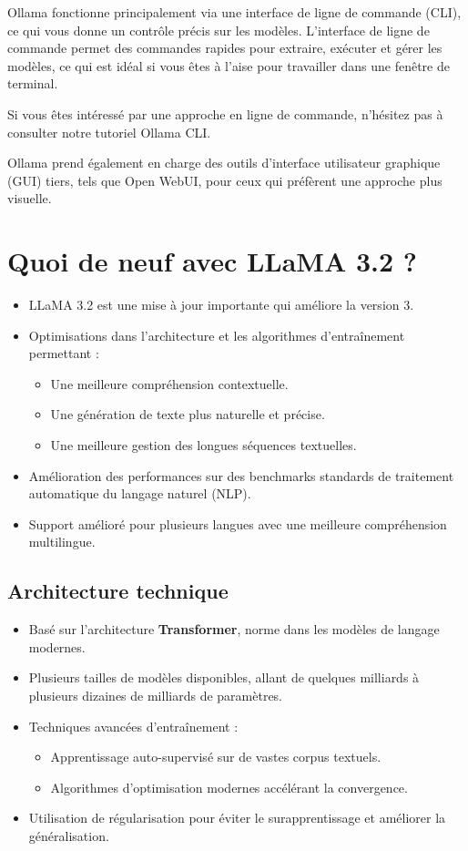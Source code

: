 Ollama fonctionne principalement via une interface de ligne de commande (CLI), ce qui vous donne un contrôle précis sur les modèles. L’interface de ligne de commande permet des commandes rapides pour extraire, exécuter et gérer les modèles, ce qui est idéal si vous êtes à l’aise pour travailler dans une fenêtre de terminal.

\medskip

Si vous êtes intéressé par une approche en ligne de commande, n’hésitez pas à consulter notre tutoriel Ollama CLI.

\medskip

Ollama prend également en charge des outils d’interface utilisateur graphique (GUI) tiers, tels que Open WebUI, pour ceux qui préfèrent une approche plus visuelle.

\section{Quoi de neuf avec LLaMA 3.2 ?}
\begin{itemize}
    \item LLaMA 3.2 est une mise à jour importante qui améliore la version 3.
    \item Optimisations dans l’architecture et les algorithmes d’entraînement permettant :
    \begin{itemize}
        \item Une meilleure compréhension contextuelle.
        \item Une génération de texte plus naturelle et précise.
        \item Une meilleure gestion des longues séquences textuelles.
    \end{itemize}
    \item Amélioration des performances sur des benchmarks standards de traitement automatique du langage naturel (NLP).
    \item Support amélioré pour plusieurs langues avec une meilleure compréhension multilingue.
\end{itemize}

\subsection{Architecture technique}
\begin{itemize}
    \item Basé sur l’architecture \textbf{Transformer}, norme dans les modèles de langage modernes.
    \item Plusieurs tailles de modèles disponibles, allant de quelques milliards à plusieurs dizaines de milliards de paramètres.
    \item Techniques avancées d’entraînement :
    \begin{itemize}
        \item Apprentissage auto-supervisé sur de vastes corpus textuels.
        \item Algorithmes d’optimisation modernes accélérant la convergence.
    \end{itemize}
    \item Utilisation de régularisation pour éviter le surapprentissage et améliorer la généralisation.
\end{itemize}

